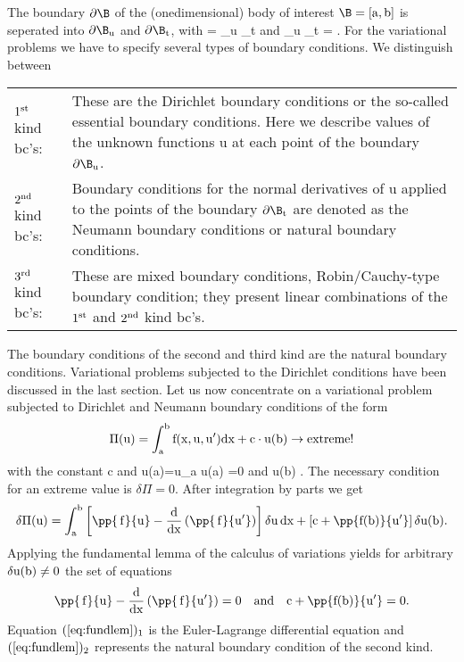 The boundary $\rm \partial \B$ of the (onedimensional) body of 
interest $\rm \B = [a,b]$ is seperated into 
$\rm \partial \B_u$ and $\rm \partial \B_t$, with
\eb\rm 
\partial \B = \partial \B_u \bigcup \partial \B_t
\quad and \quad 
\partial \B_u \bigcap \partial \B_t = \emptyset .
\ee
For the variational problems we have to specify several types of 
boundary conditions. We distinguish between
\begin{center}
\renewcommand{\arraystretch}{1.5}
\begin{tabular}{lp{9.3cm}}
$\rm 1^{st}$ kind bc's: & These are the Dirichlet boundary conditions or the so-called
essential boundary conditions. Here we describe values of the unknown functions u at each
point of the boundary $\rm \partial \B_u$. \\
$\rm 2^{nd}$ kind bc's: & Boundary conditions for the normal derivatives of u applied to the 
points of the boundary $\rm \partial \B_t$ are denoted as the 
Neumann boundary conditions or natural boundary conditions. \\
$\rm 3^{rd}$ kind bc's: & These are mixed boundary conditions, 
Robin/Cauchy-type boundary condition;
they present linear combinations of the $\rm 1^{st}$ and 
$\rm 2^{nd}$ kind bc's.
\end{tabular}
\end{center}
The boundary conditions of the second and third kind are the natural boundary conditions.
Variational problems subjected to the Dirichlet conditions have been discussed in the last
section. Let us now concentrate on a variational problem subjected to Dirichlet 
and Neumann boundary conditions of the form  
\begin{equation}
\rm
\Pi(u) = \int_a^b f(x,u,u') dx + c \cdot u(b) \rightarrow extreme!
\end{equation}
with the constant c and
\eb
\rm
u(a)=u_a \;\; \rightarrow \;\; 
\delta u(a) =0 \quad  and \quad  \delta u(b) .
\ee
The necessary condition for an extreme value is $\delta \Pi = 0$. After integration by 
parts we get 
\begin{equation}
\rm
\delta \Pi(u) = \int_a^b \left[ \pp{ \, f}{u} - \frac{d}{dx} 
\left( \pp{ \, f}{u'}\right) \right] \delta u \, dx + \left[ c + \pp{f(b)}{u'}
\right] \delta u(b) .
\end{equation}
Applying the fundamental lemma of the calculus of variations yields for arbitrary
$\rm \delta u(b) \neq 0$ the set of equations
\begin{equation} 
\rm \displaystyle 
\pp{ \, f}{u} - \dfrac{d}{dx} \left( \pp{ \, f}{u'} \right) = 0 
\quad and \quad 
\rm c + \displaystyle \pp{f(b)}{u'} = 0 .
\label{eq:fundlem}
\end{equation}
Equation $(\ref{eq:fundlem})_1$ is the Euler-Lagrange differential equation
and $(\ref{eq:fundlem})_2$ represents the natural boundary condition of the second kind.  

